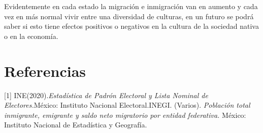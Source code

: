 \documentclass{article}
\begin{document}
Evidentemente en cada estado la migración e inmigración van en aumento y cada vez en más normal vivir entre una diversidad de culturas, en un futuro se podrá saber si esto tiene efectos positivos o negativos en la cultura de la sociedad nativa o en la economía.
\section{Referencias}
[1] INE(2020).\textit{Estadística de Padrón Electoral y Lista Nominal de Electores.}México: Instituto Nacional Electoral.\newline
[2]INEGI. (Varios). \textit{Población total inmigrante, emigrante y saldo neto migratorio por entidad federativa.} México: Instituto Nacional de Estadística y Geografía.
\end{document}
